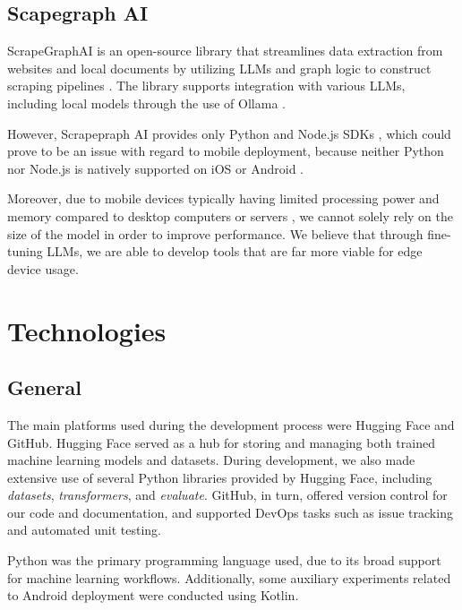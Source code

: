 \documentclass[licencjacka,en]{pracamgr}
\begin{document}
\section{Scapegraph AI}
ScrapeGraphAI is an open-source library that streamlines data extraction from websites and local documents by utilizing LLMs and graph logic to construct scraping pipelines \cite{scapegraph_repo}. The library supports integration with various LLMs, including local models through the use of Ollama \cite{ollama_repo} \cite{scapegraph_usage}.

However, Scrapepraph AI provides only Python and Node.js SDKs \cite{scapegraph_sdks}, which could prove to be an issue with regard to mobile deployment, because neither Python nor Node.js is natively supported on iOS or Android \cite{android_dev_site} \cite{ios_dev_site}.

Moreover, due to mobile devices typically having limited processing power and memory compared to desktop computers or servers \cite{mobile_resources}, we cannot solely rely on the size of the model in order to improve performance. We believe that through fine-tuning LLMs, we are able to develop tools that are far more viable for edge device usage.

\chapter{Technologies}

\section{General}

The main platforms used during the development process were Hugging Face\cite{hugging-face} and GitHub\cite{github}. Hugging Face served as a hub for storing and managing both trained machine learning models and datasets. During development, we also made extensive use of several Python libraries provided by Hugging Face, including \textit{datasets}\cite{lhoest2021datasetscommunitylibrarynatural}, \textit{transformers}\cite{wolf-etal-2020-transformers}, and \textit{evaluate}\cite{evaluate}. GitHub, in turn, offered version control for our code and documentation, and supported DevOps tasks such as issue tracking and automated unit testing.

Python\cite{python} was the primary programming language used, due to its broad support for machine learning workflows. Additionally, some auxiliary experiments related to Android deployment were conducted using Kotlin\cite{kotlin}\cite{service_demo_app_repo}.
\end{document}
